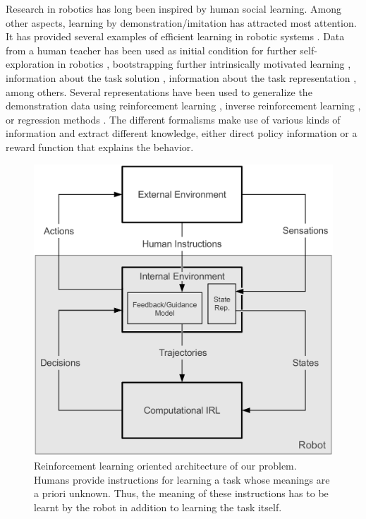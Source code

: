 Research in robotics has long been inspired by human social learning. Among other aspects, learning by demonstration/imitation has attracted most attention. It has provided several examples of efficient learning in robotic systems \cite{Argall09lfdsurvey}\cite{lopes10imitationchapter}. Data from a human teacher has been used as initial condition for further self-exploration in robotics \cite{nicolescu2003natural}, bootstrapping further intrinsically motivated learning \cite{nguyen2011bootstrapping}, information about the task solution \cite{Calinon07}, information about the task representation \cite{macl07affimit}, among others. Several representations have been used to generalize the demonstration data using reinforcement learning \cite{Thomaz2008}, inverse reinforcement learning \cite{macl07affimit}\cite{Abbeel04icml}, or regression methods \cite{Calinon07}\cite{chernova09jair}. The different formalisms make use of various kinds of information and extract different knowledge, either direct policy information or a reward function that explains the behavior.
%
\begin{figure}[!t]
	\begin{center}
   		\includegraphics[width=0.8\columnwidth]{images/problem_representation.png}
   		\caption{Reinforcement learning oriented architecture of our problem. Humans provide instructions for learning a task whose meanings are a priori unknown. Thus, the meaning of these instructions has to be learnt by the robot in addition to learning the task itself.}
		\label{fig1} 
   \end{center}
\end{figure}

